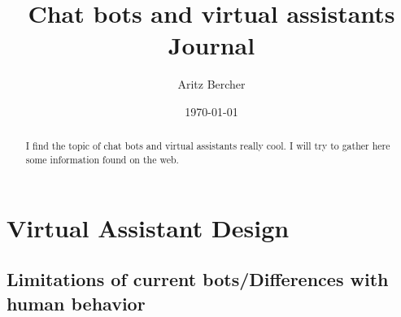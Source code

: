 \documentclass[11pt,a4paper]{article}
\title{Chat bots and virtual assistants\\ Journal}
\author{Aritz Bercher}
\date{\today}
\begin{document}
\maketitle

\begin{abstract}
I find the topic of chat bots and virtual assistants really cool. I will try to gather here some information found on the web.
\end{abstract}

\section{Virtual Assistant Design}

\subsection{Limitations of current bots/Differences with human behavior}
\end{document}
